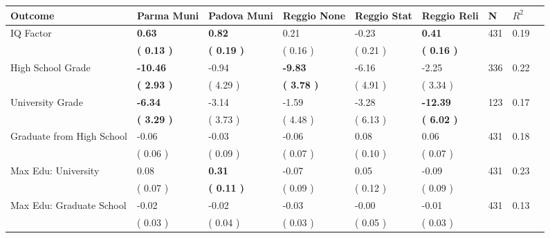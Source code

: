 \begin{tabular}{L{6.2cm} C{1.8cm} C{1.8cm} C{1.8cm} C{1.8cm} C{1.8cm} C{1.8cm} C{0.3cm} C{0.3cm}}
\toprule
 \textbf{Outcome} & \textbf{Parma Muni} & \textbf{Padova Muni} & \textbf{Reggio None} & \textbf{Reggio Stat} & \textbf{Reggio Reli} & \textbf{N} & \textbf{$ R^2$} \\
\midrule
IQ Factor & \textbf{     0.63} & \textbf{     0.82} &      0.21 &     -0.23 & \textbf{     0.41}  & 431 &       0.19 \\ 
 & \textbf{(     0.13 )} & \textbf{(     0.19 )} & (     0.16 ) & (     0.21 ) & \textbf{(     0.16 )}  & \\
High School Grade & \textbf{   -10.46} &     -0.94 & \textbf{    -9.83} &     -6.16 &     -2.25  & 336 &       0.22 \\ 
 & \textbf{(     2.93 )} & (     4.29 ) & \textbf{(     3.78 )} & (     4.91 ) & (     3.34 )  & \\
University Grade & \textbf{    -6.34} &     -3.14 &     -1.59 &     -3.28 & \textbf{   -12.39}  & 123 &       0.17 \\ 
 & \textbf{(     3.29 )} & (     3.73 ) & (     4.48 ) & (     6.13 ) & \textbf{(     6.02 )}  & \\
Graduate from High School &     -0.06 &     -0.03 &     -0.06 &      0.08 &      0.06  & 431 &       0.18 \\ 
 & (     0.06 ) & (     0.09 ) & (     0.07 ) & (     0.10 ) & (     0.07 )  & \\
Max Edu: University &      0.08 & \textbf{     0.31} &     -0.07 &      0.05 &     -0.09  & 431 &       0.23 \\ 
 & (     0.07 ) & \textbf{(     0.11 )} & (     0.09 ) & (     0.12 ) & (     0.09 )  & \\
Max Edu: Graduate School &     -0.02 &     -0.02 &     -0.03 &     -0.00 &     -0.01  & 431 &       0.13 \\ 
 & (     0.03 ) & (     0.04 ) & (     0.03 ) & (     0.05 ) & (     0.03 )  & \\
\bottomrule
\end{tabular}
